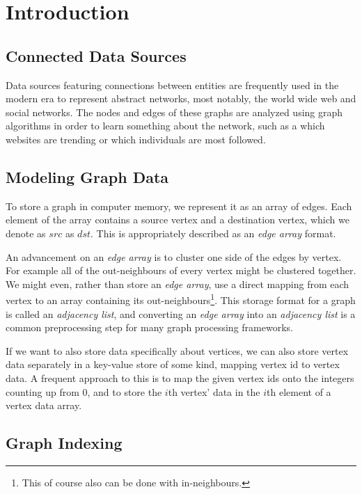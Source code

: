 \chapter{Introduction}

\section{Connected Data Sources}

Data sources featuring connections between entities are frequently used in the modern era to represent abstract networks, most notably, the world wide web and social networks. The nodes and edges of these graphs are analyzed using graph algorithms in order to learn something about the network, such as a which websites are trending or which individuals are most followed.

\section{Modeling Graph Data}

To store a graph in computer memory, we represent it as an array of edges. Each element of the array contains a source vertex and a destination vertex, which we denote as $src$ as $dst$. This is appropriately described as an \textit{edge array} format.

An advancement on an \textit{edge array} is to cluster one side of the edges by vertex. For example all of the out-neighbours of every vertex might be clustered together. We might even, rather than store an \textit{edge array}, use a direct mapping from each vertex to an array containing its out-neighbours\footnote{This of course also can be done with in-neighbours.}. This storage format for a graph is called an \textit{adjacency list}, and converting an \textit{edge array} into an \textit{adjacency list} is a common preprocessing step for many graph processing frameworks.

If we want to also store data specifically about vertices, we can also store vertex data separately in a key-value store of some kind, mapping vertex id to vertex data. A frequent approach to this is to map the given vertex ids onto the integers counting up from 0, and to store the $i$th vertex' data in the $i$th element of a vertex data array.

\section{Graph Indexing}

